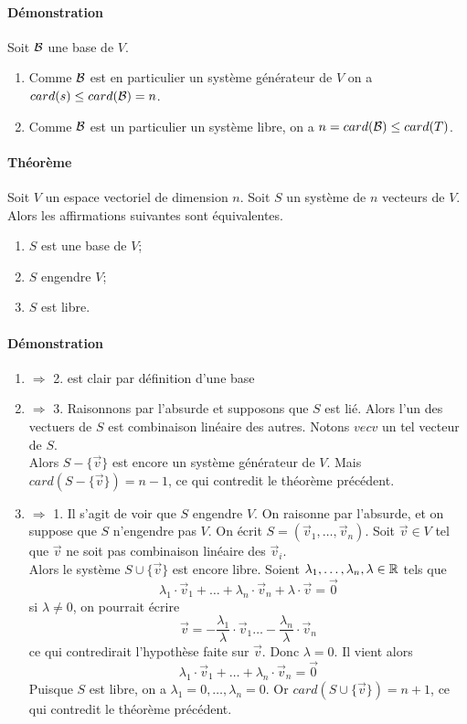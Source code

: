 \paragraph{Démonstration} Soit $\mathcal{B}$ une base de $V$.
\begin{enumerate}
  \item Comme $\mathcal{B}$ est en particulier un système générateur de $V$ on a $card(s) \leq card(\mathcal{B}) = n$.
  \item Comme $\mathcal{B}$ est un particulier un système libre, on a $n = card(\mathcal{B}) \leq card(T)$.
\end{enumerate}

\paragraph{Théorème} Soit $V$ un espace vectoriel de dimension $n$. Soit $S$ un système de $n$ vecteurs de $V$. Alors les affirmations suivantes sont équivalentes.
\begin{enumerate}
  \item $S$ est une base de $V$;
  \item $S$ engendre $V$;
  \item $S$ est libre.
\end{enumerate}

\paragraph{Démonstration}
\begin{enumerate}
  \item $\Rightarrow$ 2. est clair par définition d'une base
  \item $\Rightarrow$ 3. Raisonnons par l'absurde et supposons que $S$ est lié. Alors l'un des vectuers de $S$ est combinaison linéaire des autres. Notons $vec{v}$ un tel vecteur de $S$. \\
    Alors $S - \{ \vec{v}\}$ est encore un système générateur de $V$. Mais $card(S - \{\vec{v}\}) = n-1$, ce qui contredit le théorème précédent.
  \item $\Rightarrow$ 1. Il s'agit de voir que $S$ engendre $V$. On raisonne par l'absurde, et on suppose que $S$ n'engendre pas $V$. On écrit $S = (\vec{v}_1, \ldots, \vec{v}_n)$. Soit $\vec{v} \in V$ tel que $\vec{v}$ ne soit pas combinaison linéaire des $\vec{v}_i$. \\
    Alors le système $S \cup \{ \vec{v}\}$ est encore libre. Soient $\lambda_1, \ldots, \lambda_n, \lambda \in \mathbb{R}$ tels que 
    $$\lambda_1 \cdot \vec{v}_1 + \ldots + \lambda_n \cdot \vec{v}_n + \lambda \cdot \vec{v} = \vec{0}$$
    si $\lambda \neq 0$, on pourrait écrire 
    $$\vec{v} = -\frac{\lambda_1}{\lambda} \cdot \vec{v}_1 \ldots - \frac{\lambda_n}{\lambda} \cdot \vec{v}_n$$
    ce qui contredirait l'hypothèse faite sur $\vec{v}$. Donc $\lambda = 0$. Il vient alors
    $$\lambda_1 \cdot \vec{v}_1 + \ldots + \lambda_n  \cdot \vec{v}_n = \vec{0}$$
    Puisque $S$ est libre, on a $\lambda_1 = 0, \ldots, \lambda_n = 0$. Or $card(S \cup \{\vec{v}\} ) = n+1$, ce qui contredit le théorème précédent.
\end{enumerate}

